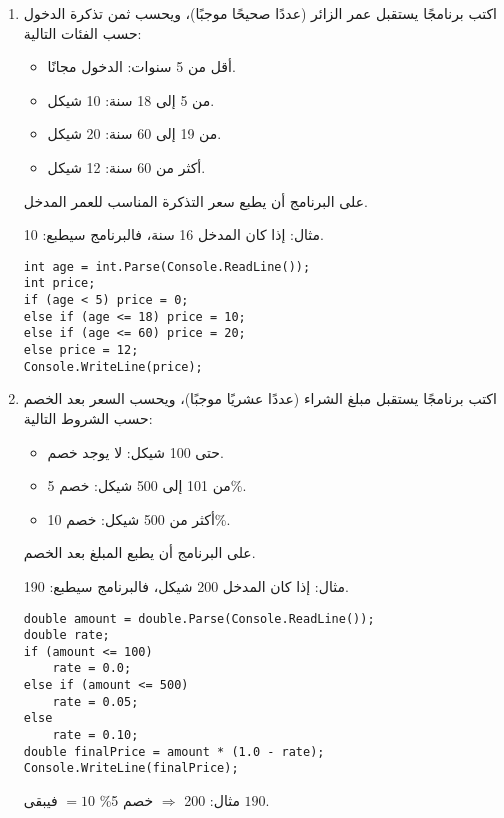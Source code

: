﻿\documentclass[12pt]{article}
\begin{document}
\begin{enumerate}[itemsep=2em]
\item
اكتب برنامجًا يستقبل عمر الزائر (عددًا صحيحًا موجبًا)، ويحسب ثمن تذكرة الدخول حسب الفئات التالية:

\begin{itemize}
  \item أقل من 5 سنوات: الدخول مجانًا.
  \item من 5 إلى 18 سنة: 10 شيكل.
  \item من 19 إلى 60 سنة: 20 شيكل.
  \item أكثر من 60 سنة: 12 شيكل.
\end{itemize}

على البرنامج أن يطبع سعر التذكرة المناسب للعمر المدخل.

مثال: إذا كان المدخل 16 سنة، فالبرنامج سيطبع: 10.

\ifwithsols
\begin{boxSolution}
\begin{english}
\begin{verbatim}
int age = int.Parse(Console.ReadLine());
int price;
if (age < 5) price = 0;
else if (age <= 18) price = 10;
else if (age <= 60) price = 20;
else price = 12;
Console.WriteLine(price);
\end{verbatim}
\end{english}
\end{boxSolution}
\fi


\item
اكتب برنامجًا يستقبل مبلغ الشراء (عددًا عشريًا موجبًا)، ويحسب السعر بعد الخصم حسب الشروط التالية:

\begin{itemize}
  \item حتى 100 شيكل: لا يوجد خصم.
  \item من 101 إلى 500 شيكل: خصم 5\%.
  \item أكثر من 500 شيكل: خصم 10\%.
\end{itemize}

على البرنامج أن يطبع المبلغ بعد الخصم.

مثال: إذا كان المدخل 200 شيكل، فالبرنامج سيطبع: 190.

\ifwithsols
\begin{boxSolution}
\begin{english}
\begin{verbatim}
double amount = double.Parse(Console.ReadLine());
double rate;
if (amount <= 100)
    rate = 0.0;
else if (amount <= 500)
    rate = 0.05;
else
    rate = 0.10;
double finalPrice = amount * (1.0 - rate);
Console.WriteLine(finalPrice);
\end{verbatim}
\end{english}
مثال: 200 \(\Rightarrow\) خصم 5\% \(=10\) فيبقى \(190\).
\end{boxSolution}
\fi



\end{enumerate}
\end{document}

